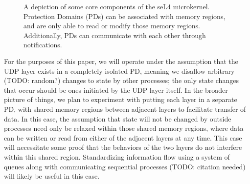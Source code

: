 \documentclass[twoside]{memoir}
\begin{document}
\begin{figure}[htpb]
    \centering
    \caption{A depiction of some core components of the seL4 microkernel.
    Protection Domains (PDs) can be associated with memory regions,
    and are only able to read or modify those memory regions.
    Additionally, PDs can communicate with each other through notifications.}
    \label{fig:sel4-mem-pd}
\end{figure}

For the purposes of this paper, we will operate under the assumption that
the UDP layer exists in a completely isolated PD, meaning
we disallow arbitrary (TODO: random?) changes to state by other processes;
the only state changes that occur should be ones initiated by the UDP
layer itself.
In the broader picture of things, we plan to experiment with putting
each layer in a separate PD,
with shared memory regions between adjacent layers to facilitate transfer of data.
In this case, the assumption that state will not be changed by outside processes
need only be relaxed within those shared memory regions, where
data can be written or read from either of the adjacent layers at any time.
This case will necessitate some proof that the behaviors of the two layers
do not interfere within this shared region.
Standardizing information flow using a system of queues along with 
communicating sequential processes (TODO: citation needed)
will likely be useful in this case.
\end{document}
